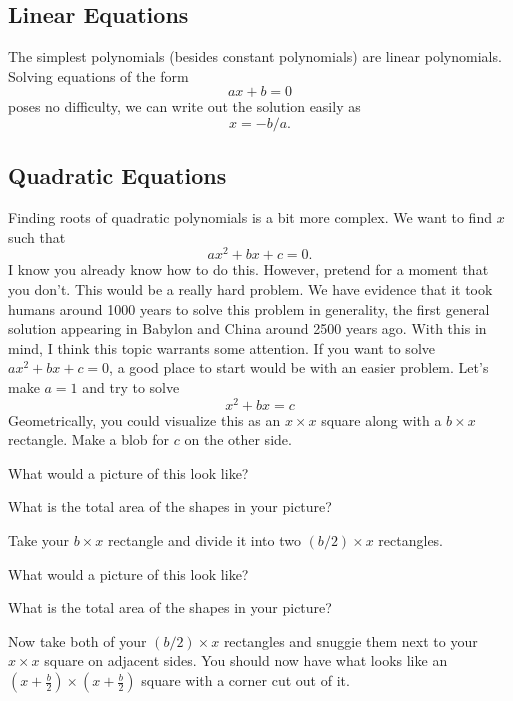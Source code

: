 \subsection{Linear Equations}

The simplest polynomials (besides constant polynomials) are linear
polynomials. Solving equations of the form
\[
ax + b = 0
\]
poses no difficulty, we can write out the solution easily as
\[
x = -b/a.
\]



\subsection{Quadratic Equations}

Finding roots of quadratic polynomials is a bit more complex. We want
to find $x$ such that
\[
ax^2 + bx + c = 0.
\]
I know you already know how to do this. However, pretend for a moment
that you don't. This would be a really hard problem. We have evidence
that it took humans around 1000 years to solve this problem in
generality, the first general solution appearing in Babylon and China
around 2500 years ago. With this in mind, I think this topic warrants
some attention. If you want to solve $ax^2 + bx + c = 0$, a good place
to start would be with an easier problem. Let's make $a=1$ and try to
solve
\[
x^2 + b x = c
\]
Geometrically, you could visualize this as an $x \times x$ square
along with a $b\times x$ rectangle. Make a blob for $c$ on the other side. 

\begin{question} What would a picture of this look like?
\end{question}
\QM

\begin{question} What is the total area of the shapes in your picture?
\end{question}
\QM

Take your $b\times x$ rectangle and divide it into two
$(b/2)\times x$ rectangles.

\begin{question} What would a picture of this look like?
\end{question}
\QM

\begin{question} What is the total area of the shapes in your picture?
\end{question}
\QM

Now take both of your $(b/2)\times x$ rectangles and snuggie them
next to your $x\times x$ square on adjacent sides. You should now have
what looks like an $(x + \frac{b}{2}) \times (x +
\frac{b}{2})$ square with a corner cut out of it.


